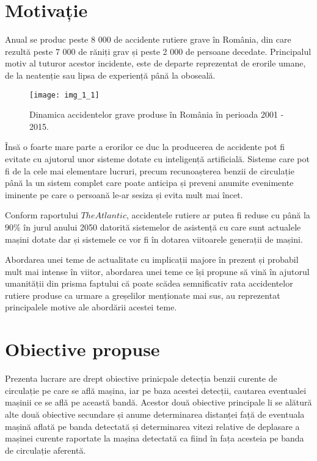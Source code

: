 \section{Motivație}

Anual se produc peste 8 000 de accidente rutiere grave în România, din care rezultă peste 7 000 de răniți grav și peste 2 000 de persoane decedate. Principalul motiv al tuturor acestor incidente, este de departe reprezentat de erorile umane, de la neatenție sau lipsa de experiență până la oboseală.
\begin{figure}[!h]
	\centering
	\texttt{[image: img\_1\_1]}
	\caption[Dinamica accidente rutiere]{Dinamica accidentelor grave produse în România în perioada 2001 - 2015.}
\end{figure} 

Însă o foarte mare parte a erorilor ce duc la producerea de accidente pot fi evitate cu ajutorul unor sisteme dotate cu inteligență artificială. Sisteme care pot fi de la cele mai elementare lucruri, precum recunoașterea benzii de circulație până la un sistem complet care poate anticipa și preveni anumite evenimente iminente pe care o persoană le-ar sesiza și evita mult mai încet.

Conform raportului $The Atlantic$, accidentele rutiere ar putea fi reduse cu până la $90\%$ în jurul anului 2050 datorită sistemelor de asistență cu care sunt actualele mașini dotate dar și sistemele ce vor fi în dotarea viitoarele generații de mașini.

Abordarea unei teme de actualitate cu implicații majore în prezent și probabil mult mai intense în viitor, abordarea unei teme ce își propune să vină în ajutorul umanității din prisma faptului că poate scădea semnificativ rata accidentelor rutiere produse ca urmare a greșelilor menționate mai sus, au reprezentat principalele motive ale abordării acestei teme.

\section{Obiective propuse}

Prezenta lucrare are drept obiective prinicpale detecția benzii curente de circulație pe care se află mașina, iar pe baza acestei detecții, cautarea eventualei mașinii ce se află pe această bandă. Acestor două obiective principale li se alătură alte două obiective secundare și anume determinarea distanței față de eventuala mașină aflată pe banda detectată și determinarea vitezi relative de deplasare a mașinei curente raportate la mașina detectată ca fiind în fața acesteia pe banda de circulație aferentă.


